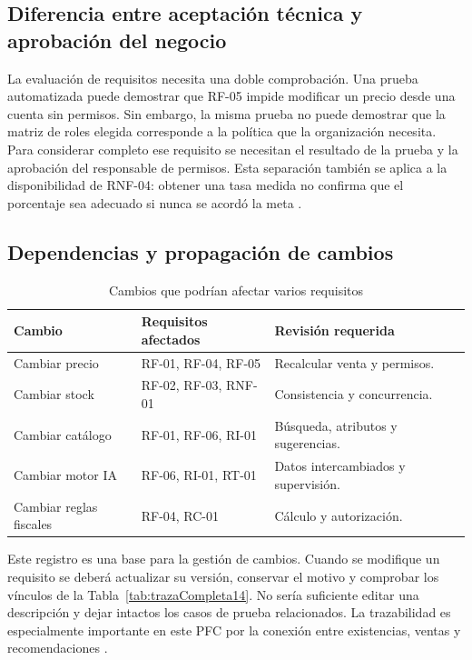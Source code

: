 \subsection{Diferencia entre aceptación técnica y aprobación del negocio}
La evaluación de requisitos necesita una doble comprobación. Una prueba automatizada puede demostrar que RF-05 impide modificar un precio desde una cuenta sin permisos. Sin embargo, la misma prueba no puede demostrar que la matriz de roles elegida corresponde a la política que la organización necesita. Para considerar completo ese requisito se necesitan el resultado de la prueba y la aprobación del responsable de permisos. Esta separación también se aplica a la disponibilidad de RNF-04: obtener una tasa medida no confirma que el porcentaje sea adecuado si nunca se acordó la meta \cite{iso29148,iso25010}.

\subsection{Dependencias y propagación de cambios}
\begin{table}[!ht]
\centering\scriptsize
\caption{Cambios que podrían afectar varios requisitos}
\label{tab:cambiosIntegrados}
\begin{tabularx}{\columnwidth}{@{}P{1.05cm}Y Y@{}}
\toprule Cambio & Requisitos afectados & Revisión requerida\\\midrule
Cambiar precio & RF-01, RF-04, RF-05 & Recalcular venta y permisos.\\
Cambiar stock & RF-02, RF-03, RNF-01 & Consistencia y concurrencia.\\
Cambiar catálogo & RF-01, RF-06, RI-01 & Búsqueda, atributos y sugerencias.\\
Cambiar motor IA & RF-06, RI-01, RT-01 & Datos intercambiados y supervisión.\\
Cambiar reglas fiscales & RF-04, RC-01 & Cálculo y autorización.\\
\bottomrule
\end{tabularx}
\end{table}

Este registro es una base para la gestión de cambios. Cuando se modifique un requisito se deberá actualizar su versión, conservar el motivo y comprobar los vínculos de la Tabla~\ref{tab:trazaCompleta14}. No sería suficiente editar una descripción y dejar intactos los casos de prueba relacionados. La trazabilidad es especialmente importante en este PFC por la conexión entre existencias, ventas y recomendaciones \cite{pohl2025,iso29148}.

